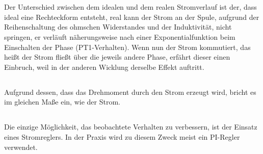 \chapter{}\label{ex:aufg6}
%
\section{}\label{sec:aufg6a}
%
Der Unterschied zwischen dem idealen und dem realen Stromverlauf ist der, dass ideal eine Rechteckform entsteht, real kann der Strom an der Spule, aufgrund der Reihenschaltung des ohmschen Widerstandes und der Induktivität, nicht springen, er verläuft näherungsweise nach einer Exponentialfunktion beim Einschalten der Phase (PT1-Verhalten). Wenn nun der Strom kommutiert, das heißt der Strom fließt über die jeweils andere Phase, erfährt dieser einen Einbruch,  weil in der anderen Wicklung derselbe Effekt auftritt.
%
\section{}\label{sec:aufg6b}
%
Aufgrund dessen, dass das Drehmoment durch den Strom erzeugt wird, bricht es im gleichen Maße ein, wie der Strom.
%
\section{}\label{sec:aufg6c}
%
Die einzige Möglichkeit, das beobachtete Verhalten zu verbessern, ist der Einsatz eines Stromreglers. In der Praxis wird zu diesem Zweck meist ein PI-Regler verwendet.